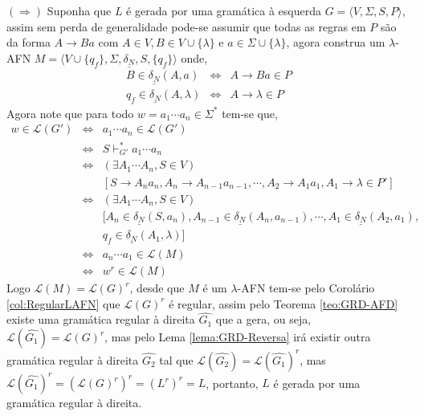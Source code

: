 \begin{prova}
	$(\Rightarrow)$ Suponha que $L$ é gerada por uma gramática à esquerda $G = \langle V, \Sigma, S, P \rangle$, assim sem perda de generalidade pode-se assumir que todas as regras em $P$ são da forma $A \rightarrow Ba$ com $A \in V, B \in V \cup \{\lambda\}$ e $a \in \Sigma \cup \{\lambda\}$,  agora construa um $\lambda$-AFN $M = \langle V \cup \{q_f\}, \Sigma, \underline{\delta_N}, S, \{q_f\} \rangle$ onde, 
	\begin{eqnarray*}
		B \in \underline{\delta_N}(A, a) & \Longleftrightarrow & A \rightarrow Ba \in P\\
		q_f \in \underline{\delta_N}(A, \lambda)& \Longleftrightarrow & A \rightarrow \lambda \in P
	\end{eqnarray*} 
	Agora note que para todo $w = a_1\cdots a_n \in \Sigma^*$ tem-se que,
	\begin{eqnarray*}
		w \in \mathcal{L}(G') & \Longleftrightarrow &  a_1\cdots a_n \in \mathcal{L}(G')\\
		& \Longleftrightarrow & S \vdash_{G'}^* a_1\cdots a_n\\
		& \Longleftrightarrow & (\exists A_1 \cdots A_n, S \in V)\\
		& & [S \rightarrow A_na_n, A_n \rightarrow A_{n-1}a_{n-1}, \cdots, A_{2} \rightarrow A_1a_1, A_1 \rightarrow \lambda \in P']\\
		& \Longleftrightarrow & (\exists A_1 \cdots A_n, S \in V)\\
		& & [A_n \in \underline{\delta_N}(S, a_n), A_{n-1} \in \underline{\delta_N}(A_n, a_{n-1}), \cdots,  A_{1} \in \underline{\delta_N}(A_2, a_{1}), \\
		& &  q_f \in \underline{\delta_N}(A_1, \lambda)]\\
		& \Longleftrightarrow & a_n\cdots a_1 \in \mathcal{L}(M)\\
		& \Longleftrightarrow & w^r \in \mathcal{L}(M)
	\end{eqnarray*}
	Logo $\mathcal{L}(M) = \mathcal{L}(G)^r$, desde que $M$ é um $\lambda$-AFN tem-se pelo Corolário \ref{col:RegularLAFN} que $\mathcal{L}(G)^r$ é regular, assim pelo Teorema \ref{teo:GRD-AFD} existe uma gramática regular à direita $\hat{G_1}$ que a gera, ou seja, $\mathcal{L}(\hat{G_1}) = \mathcal{L}(G)^r$, mas pelo Lema \ref{lema:GRD-Reversa} irá existir outra gramática regular à direita $\hat{G_2}$ tal que $\mathcal{L}(\hat{G_2}) = \mathcal{L}(\hat{G_1})^r$, mas $ \mathcal{L}(\hat{G_1})^r = (\mathcal{L}(G)^r)^r = (L^r)^r = L$, portanto, $L$ é gerada por uma gramática regular à direita. 
	

\end{prova}
